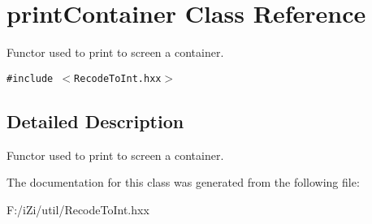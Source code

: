 \section{print\-Container Class Reference}
\label{classprint_container}
Functor used to print to screen a container.  


{\tt \#include $<$Recode\-To\-Int.hxx$>$}



\subsection{Detailed Description}
Functor used to print to screen a container. 



The documentation for this class was generated from the following file:\begin{CompactItemize}
\item 
F:/i\-Zi/util/Recode\-To\-Int.hxx\end{CompactItemize}
